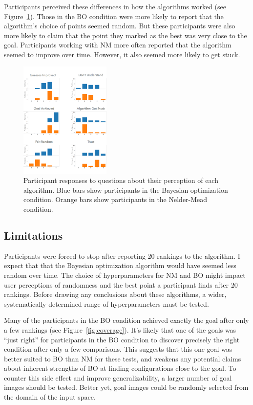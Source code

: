 Participants perceived these differences in how the algorithms worked (see Figure~\ref{fig:feedback}).
Those in the BO condition were more likely to report that the algorithm's choice of points seemed random.
But these participants were also more likely to claim that the point they marked as the best was very close to the goal.
Participants working with NM more often reported that the algorithm seemed to improve over time.
However, it also seemed more likely to get stuck.

\begin{figure}
  \centering
  \includegraphics[width=0.4\textwidth]{figures/feedback}
  \caption{%
    Participant responses to questions about their perception of each algorithm.
    Blue bars show participants in the Bayesian optimization condition.
    Orange bars show participants in the Nelder-Mead condition.
  }\label{fig:feedback}
\end{figure}

\subsection{Limitations}

Participants were forced to stop after reporting 20 rankings to the algorithm.
I expect that that the Bayesian optimization algorithm would have seemed less random over time.
The choice of hyperparameters for NM and BO might impact user perceptions of randomness and the best point a participant finds after 20 rankings.
Before drawing any conclusions about these algorithms, a wider, systematically-determined range of hyperparameters must be tested.

Many of the participants in the BO condition achieved exactly the goal after only a few rankings (see Figure~\ref{fig:coverage}).
It's likely that one of the goals was ``just right'' for participants in the BO condition to discover precisely the right condition after only a few comparisons.
This suggests that this one goal was better suited to BO than NM for these tests, and weakens any potential claims about inherent strengths of BO at finding configurations close to the goal.
To counter this side effect and improve generalizability, a larger number of goal images should be tested.
Better yet, goal images could be randomly selected from the domain of the input space.
